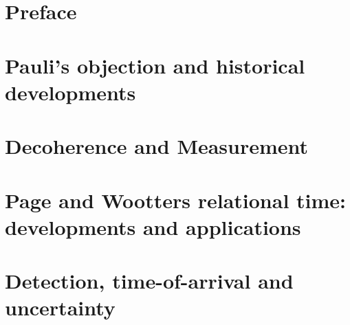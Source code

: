 




\frontmatter

\maketitle

\cleardoublepage
{}
\tableofcontents

\listoffigures

\listoftables

\chapter*{Preface}


\mainmatter

\chapter{Pauli's objection and historical developments}






\chapter{Decoherence and Measurement}\label{ch:decohere}









\chapter{Page and Wootters relational time: developments and applications}
  \label{ch:pw}




\chapter{Detection, time-of-arrival and uncertainty}\label{ch:detect}





